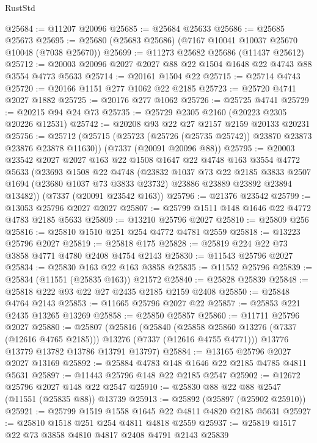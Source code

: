 \begin{lexlean}{RustStd}
\begin{coremodule}
@25684 := @11207 @20096
@25685 := @25684 @25633
@25686 := @25685 @25673
@25695 := @25680 (@25683 @25686) (@7167 @10041 @10037 @25670 @10048 (@7038 @25670))
@25699 := @11273 @25682 @25686 (@11437 @25612)
@25712 := @20003 @20096 @2027 @2027 @88 @22 @1504 @1648 @22 @4743 @88 @3554 @4773 @5633
@25714 := @20161 @1504 @22
@25715 := @25714 @4743
@25720 := @20166 @1151 @277 @1062 @22 @2185
@25723 := @25720 @4741 @2027 @1882
@25725 := @20176 @277 @1062
@25726 := @25725 @4741
@25729 := @20215 @94 @24 @73
@25735 := @25729 @2305 @2160 (@20223 @2305 @20226 @12531)
@25742 := @20208 @93 @22 @27 @2157 @2159 @20133 @20231
@25756 := @25712
    (@25715 (@25723 (@25726 (@25735 @25742)) @23870 @23873 @23876 @23878 @11630))
    (@7337 (@20091 @20096 @88))
@25795 := @20003
    @23542
    @2027
    @2027
    @163
    @22
    @1508
    @1647
    @22
    @4748
    @163
    @3554
    @4772
    @5633
    (@23693
      @1508
      @22
      @4748
      (@23832
        @1037
        @73
        @22
        @2185
        @3833
        @2507
        @1694
        (@23680 @1037 @73 @3833 @23732)
        @23886
        @23889
        @23892
        @23894
        @13482))
    (@7337 (@20091 @23542 @163))
@25796 := @21376 @23542
@25799 := @13053 @25796 @2027 @2027
@25807 := @25799 @1511 @148 @1646 @22 @4772 @4783 @2185 @5633
@25809 := @13210 @25796 @2027
@25810 := @25809 @256
@25816 := @25810 @1510 @251 @254 @4772 @4781 @2559
@25818 := @13223 @25796 @2027
@25819 := @25818 @175
@25828 := @25819 @224 @22 @73 @3858 @4771 @4780 @2408 @4754 @2143
@25830 := @11543 @25796 @2027
@25834 := @25830 @163 @22 @163 @3858
@25835 := @11552 @25796
@25839 := @25834 (@11551 (@25835 @163)) @21572
@25840 := @25828 @25839
@25848 := @25818 @222 @93 @22 @27 @2435 @2185 @2159 @2408
@25850 := @25848 @4764 @2143
@25853 := @11665 @25796 @2027 @22
@25857 := @25853 @221 @2435 @13265 @13269
@25858 := @25850 @25857
@25860 := @11711 @25796 @2027
@25880 := @25807
    (@25816
      (@25840
        (@25858 @25860 @13276 (@7337 (@12616 @4765 @2185)))
        @13276
        (@7337 (@12616 @4755 @4771)))
      @13776
      @13779
      @13782
      @13786
      @13791
      @13797)
@25884 := @13165 @25796 @2027 @2027 @13169
@25892 := @25884 @4783 @148 @1646 @22 @2185 @4785 @4811 @5631
@25897 := @11443 @25796 @148 @22 @2185 @2547
@25902 := @12672 @25796 @2027 @148 @22 @2547
@25910 := @25830 @88 @22 @88 @2547 (@11551 (@25835 @88)) @13739
@25913 := @25892 (@25897 (@25902 @25910))
@25921 := @25799 @1519 @1558 @1645 @22 @4811 @4820 @2185 @5631
@25927 := @25810 @1518 @251 @254 @4811 @4818 @2559
@25937 := @25819 @1517 @22 @73 @3858 @4810 @4817 @2408 @4791 @2143 @25839

\end{coremodule}
\end{lexlean}
